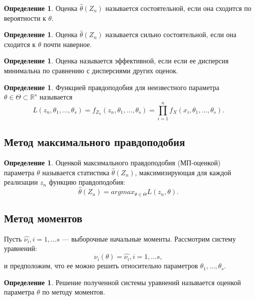 \documentclass[12pt]{report}
\theoremstyle{definition}
\newtheorem{definition}[theorem]{Определение}
\newcommand{\R}{\mathbb R}
\begin{document}
\begin{definition}
Оценка $\hat{\theta}(Z_n)$ называется состоятельной, если она сходится
по вероятности к $\theta$.
\end{definition}

\begin{definition}
Оценка $\hat{\theta}(Z_n)$ называется сильно состоятельной, если она сходится к
$\theta$ почти наверное.
\end{definition}

\begin{definition}
Оценка называется эффективной, если если ее дисперсия минимальна по сравнению
с дисперсиями других оценок.
\end{definition}

\begin{definition}
Функцией правдоподобия для неизвестного параметра $\theta \in \Theta \subset \R^s$
называется
$$
L(z_n, \theta_1, \dots, \theta_s) =
f_{Z_n}(z_n, \theta_1, \dots, \theta_s) =
\prod_{i = 1}^{n} f_X(x_i, \theta_1, \dots, \theta_s).
$$
\end{definition}

\subsection{Метод максимального правдоподобия}
\begin{definition}
Оценкой максимального правдоподобия (МП-оценкой) параметра $\theta$
называется статистика $\hat{\theta}(Z_n)$, максимизирующая для каждой
реализации $z_n$ функцию правдоподобия:
$$
\hat{\theta}(Z_n) = argmax_{\theta \in \Theta} L(z_n, \theta).
$$
\end{definition}

\subsection{Метод моментов}
Пусть $\hat{\nu_i}, i = 1, \dots s$ --- выборочные начальные моменты.
Рассмотрим систему уравнений:
$$
\nu_i(\theta) = \hat{\nu_i}, i = 1, \dots s,
$$
и предположим, что ее можно решить относительно параметров
$\theta_1, \dots, \theta_s$.

\begin{definition}
Решение полученной системы уравнений называется оценкой параметра $\theta$
по методу моментов.
\end{definition}

\end{document}
